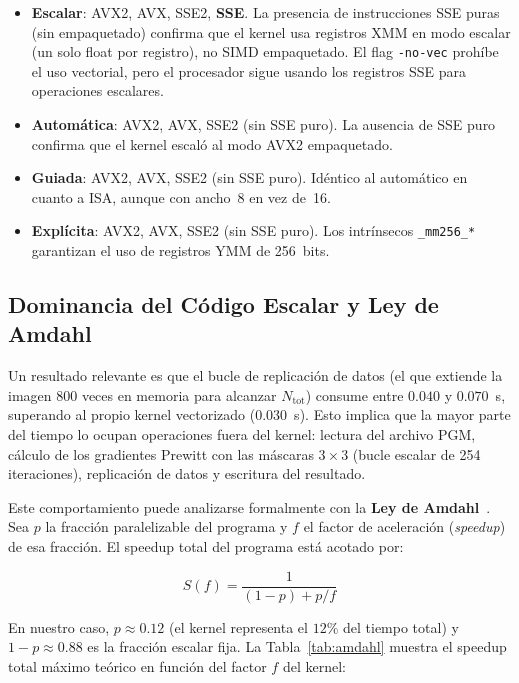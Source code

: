 \begin{itemize}
  \item \textbf{Escalar}: AVX2, AVX, SSE2, \textbf{SSE}.
    La presencia de instrucciones SSE puras (sin empaquetado)
    confirma que el kernel usa registros XMM en modo escalar
    (un solo float por registro), no SIMD empaquetado.
    El flag \texttt{-no-vec} proh\'ibe el uso vectorial, pero
    el procesador sigue usando los registros SSE para operaciones
    escalares.

  \item \textbf{Autom\'atica}: AVX2, AVX, SSE2 (sin SSE puro).
    La ausencia de SSE puro confirma que el kernel escal\'o al
    modo AVX2 empaquetado.

  \item \textbf{Guiada}: AVX2, AVX, SSE2 (sin SSE puro).
    Idéntico al autom\'atico en cuanto a ISA, aunque con ancho~8
    en vez de~16.

  \item \textbf{Expl\'icita}: AVX2, AVX, SSE2 (sin SSE puro).
    Los intr\'insecos \texttt{\_mm256\_*} garantizan el uso de
    registros YMM de 256~bits.
\end{itemize}

\subsection{Dominancia del C\'odigo Escalar y Ley de Amdahl}

Un resultado relevante es que el bucle de replicaci\'on de
datos (el que extiende la imagen 800 veces en memoria para
alcanzar $N_{\text{tot}}$) consume entre $0.040$ y $0.070$~s,
superando al propio kernel vectorizado ($0.030$~s).
Esto implica que la mayor parte del tiempo lo ocupan operaciones
fuera del kernel: lectura del archivo PGM, c\'alculo de los
gradientes Prewitt con las m\'ascaras $3\times3$ (bucle escalar
de 254 iteraciones), replicaci\'on de datos y escritura
del resultado.

Este comportamiento puede analizarse formalmente con la
\textbf{Ley de Amdahl}~\cite{sutter2005}.
Sea $p$ la fracci\'on paralelizable del programa y $f$ el
factor de aceleraci\'on (\textit{speedup}) de esa fracci\'on.
El speedup total del programa est\'a acotado por:

\begin{equation}
  S(f) = \frac{1}{(1-p) + p/f}
  \label{eq:amdahl}
\end{equation}

En nuestro caso, $p \approx 0.12$ (el kernel representa el
$12\%$ del tiempo total) y $1-p \approx 0.88$ es la fracci\'on
escalar fija.
La Tabla~\ref{tab:amdahl} muestra el speedup total m\'aximo
te\'orico en funci\'on del factor $f$ del kernel:

